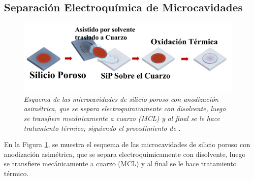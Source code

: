 \documentclass[a4paper,11pt,]{book}
\begin{document}
\subsection{Separación Electroquímica de Microcavidades }
\begin{figure}[H]
	\centering
	\includegraphics[scale=.35]{../Images/Spleva1}
	\caption{\emph{Esquema de  las microcavidades de silicio poroso con anodización asimétrica,  que se separa electroquimicamente con disolvente, luego se transfiere mecánicamente a cuarzo (MCL) y al final se le hace tratamiento térmico; siguiendo el procedimiento de }\cite{I10L}.}
	\label{fig:p6}
\end{figure}
En la Figura \ref{fig:p6}, se muestra el esquema de  las microcavidades de silicio poroso con anodización asimétrica,  que se separa electroquimicamente con disolvente, luego se transfiere mecánicamente a cuarzo (MCL) y al final se le hace tratamiento térmico. 
\end{document}
